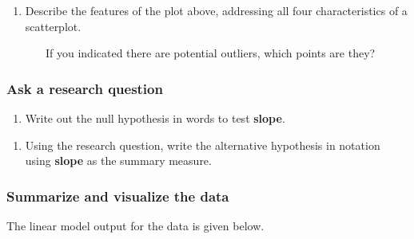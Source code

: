 \documentclass[
]{report}
\newenvironment{Shaded}{\begin{snugshade}}{\end{snugshade}}
\newcommand{\AttributeTok}[1]{\textcolor[rgb]{0.77,0.63,0.00}{#1}}
\newcommand{\CommentTok}[1]{\textcolor[rgb]{0.56,0.35,0.01}{\textit{#1}}}
\newcommand{\DecValTok}[1]{\textcolor[rgb]{0.00,0.00,0.81}{#1}}
\newcommand{\FunctionTok}[1]{\textcolor[rgb]{0.00,0.00,0.00}{#1}}
\newcommand{\NormalTok}[1]{#1}
\newcommand{\OtherTok}[1]{\textcolor[rgb]{0.56,0.35,0.01}{#1}}
\newcommand{\SpecialCharTok}[1]{\textcolor[rgb]{0.00,0.00,0.00}{#1}}
\providecommand{\tightlist}{%
  \setlength{\itemsep}{0pt}\setlength{\parskip}{0pt}}
\begin{document}
\begin{enumerate}
\def\labelenumi{\arabic{enumi}.}
\setcounter{enumi}{1}
\tightlist
\item
  Describe the features of the plot above, addressing all four characteristics of a scatterplot.
\end{enumerate}

\vspace{1in}

~~~~~~~If you indicated there are potential outliers, which points are they?

\vspace{0.5in}

\hypertarget{ask-a-research-question-4}{%
\subsubsection*{Ask a research question}\label{ask-a-research-question-4}}

\begin{enumerate}
\def\labelenumi{\arabic{enumi}.}
\setcounter{enumi}{2}
\tightlist
\item
  Write out the null hypothesis in words to test \textbf{slope}.
\end{enumerate}

\vspace{0.8in}

\begin{enumerate}
\def\labelenumi{\arabic{enumi}.}
\setcounter{enumi}{3}
\tightlist
\item
  Using the research question, write the alternative hypothesis in notation using \textbf{slope} as the summary measure.
\end{enumerate}

\vspace{0.5in}

\hypertarget{summarize-and-visualize-the-data-4}{%
\subsubsection*{Summarize and visualize the data}\label{summarize-and-visualize-the-data-4}}

The linear model output for the data is given below.

\begin{Shaded}
\end{Shaded}
\end{document}
